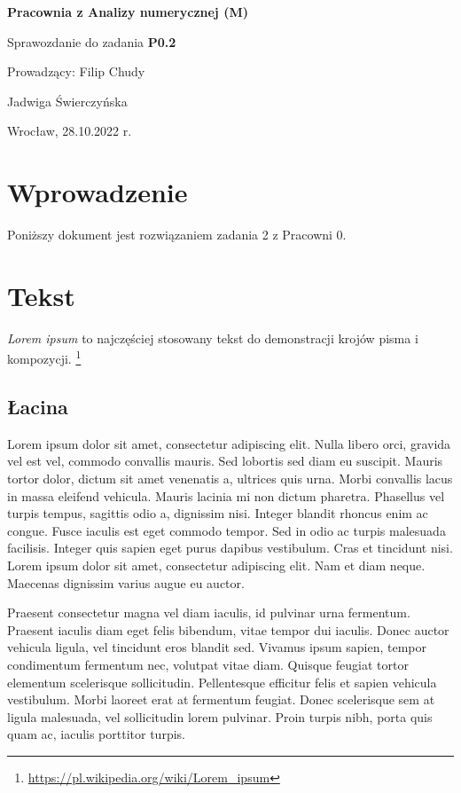\documentclass{article}
\begin{document}
\begin{center}
    \LARGE
    \textbf{Pracownia z Analizy numerycznej (M)}

    \medskip

    Sprawozdanie do zadania {\bf P0.2}
    
    {\Large Prowadzący: Filip Chudy}

    \bigskip

    {\Large Jadwiga Świerczyńska}

    {\Large Wrocław, 28.10.2022 r.}
    
\end{center}

\bigskip


\section{Wprowadzenie}

Poniższy dokument jest rozwiązaniem zadania 2 z Pracowni 0.

\section{Tekst}

\textit{Lorem ipsum} to najczęściej stosowany tekst do demonstracji krojów pisma i kompozycji. \footnote{\url{https://pl.wikipedia.org/wiki/Lorem_ipsum}}

\subsection{Łacina}

Lorem ipsum dolor sit amet, consectetur adipiscing elit. Nulla libero orci, gravida vel est vel, commodo convallis mauris. Sed lobortis sed diam eu suscipit. Mauris tortor dolor, dictum sit amet venenatis a, ultrices quis urna. Morbi convallis lacus in massa eleifend vehicula. Mauris lacinia mi non dictum pharetra. Phasellus vel turpis tempus, sagittis odio a, dignissim nisi. Integer blandit rhoncus enim ac congue. Fusce iaculis est eget commodo tempor. Sed in odio ac turpis malesuada facilisis. Integer quis sapien eget purus dapibus vestibulum. Cras et tincidunt nisi. Lorem ipsum dolor sit amet, consectetur adipiscing elit. Nam et diam neque. Maecenas dignissim varius augue eu auctor.

Praesent consectetur magna vel diam iaculis, id pulvinar urna fermentum. Praesent iaculis diam eget felis bibendum, vitae tempor dui iaculis. Donec auctor vehicula ligula, vel tincidunt eros blandit sed. Vivamus ipsum sapien, tempor condimentum fermentum nec, volutpat vitae diam. Quisque feugiat tortor elementum scelerisque sollicitudin. Pellentesque efficitur felis et sapien vehicula vestibulum. Morbi laoreet erat at fermentum feugiat. Donec scelerisque sem at ligula malesuada, vel sollicitudin lorem pulvinar. Proin turpis nibh, porta quis quam ac, iaculis porttitor turpis.
\end{document}
